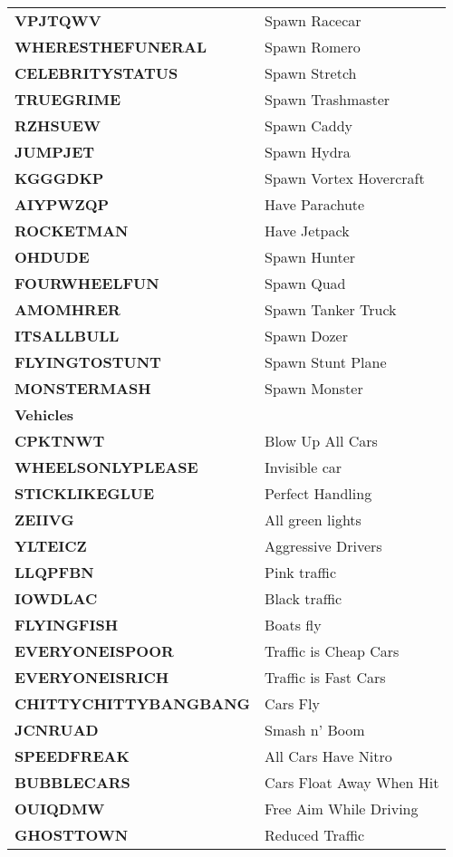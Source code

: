 \documentclass{article}
\begin{document}
\begin{small}
\begin{longtable}{|l l|}
	\textbf{VPJTQWV }& Spawn Racecar \\
	\textbf{WHERESTHEFUNERAL }& Spawn Romero \\
	\textbf{CELEBRITYSTATUS }& Spawn Stretch \\
	\textbf{TRUEGRIME }& Spawn Trashmaster \\
	\textbf{RZHSUEW }& Spawn Caddy \\
	\textbf{JUMPJET }& Spawn Hydra \\
	\textbf{KGGGDKP }& Spawn Vortex Hovercraft \\
	\textbf{AIYPWZQP }& Have Parachute \\
	\textbf{ROCKETMAN }& Have Jetpack \\
	\textbf{OHDUDE }& Spawn Hunter \\
	\textbf{FOURWHEELFUN }& Spawn Quad \\
	\textbf{AMOMHRER }& Spawn Tanker Truck \\
	\textbf{ITSALLBULL }& Spawn Dozer \\
	\textbf{FLYINGTOSTUNT }& Spawn Stunt Plane \\
	\textbf{MONSTERMASH }& Spawn Monster \\
	\hline
	\hline
	\textbf{Vehicles}& \\
	\hline
	\textbf{CPKTNWT }& Blow Up All Cars \\
	\textbf{WHEELSONLYPLEASE }& Invisible car \\
	\textbf{STICKLIKEGLUE }& Perfect Handling \\
	\textbf{ZEIIVG }& All green lights \\
	\textbf{YLTEICZ }& Aggressive Drivers \\
	\textbf{LLQPFBN }& Pink traffic \\
	\textbf{IOWDLAC }& Black traffic \\
	\textbf{FLYINGFISH }& Boats fly \\
	\textbf{EVERYONEISPOOR }& Traffic is Cheap Cars \\
	\textbf{EVERYONEISRICH }& Traffic is Fast Cars \\
	\textbf{CHITTYCHITTYBANGBANG }& Cars Fly \\
	\textbf{JCNRUAD }& Smash n' Boom \\
	\textbf{SPEEDFREAK }& All Cars Have Nitro \\
	\textbf{BUBBLECARS }& Cars Float Away When Hit \\
	\textbf{OUIQDMW }& Free Aim While Driving \\
	\textbf{GHOSTTOWN }& Reduced Traffic \\

\end{longtable}
\end{small}
\end{document}
